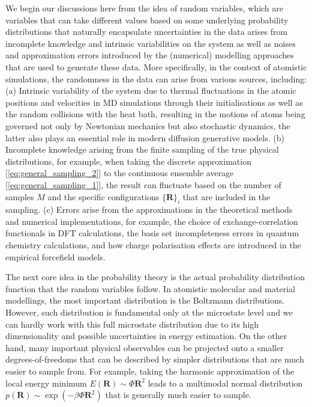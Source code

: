 We begin our discussions here from the idea of random variables, which are variables that can take different values based on some underlying probability distributions that naturally encapsulate uncertainties in the data arises from incomplete knowledge and intrinsic variabilities on the system as well as noises and approximation errors introduced by the (numerical) modelling approaches that are used to generate these data. More specifically, in the context of atomistic simulations, the randomness in the data can arise from various sources, including: (a) Intrinsic variability of the system due to thermal fluctuations in the atomic positions and velocities in MD simulations through their initialisations as well as the random collisions with the heat bath, resulting in the motions of atoms being governed not only by Newtonian mechanics but also stochastic dynamics, the latter also plays an essential role in modern diffusion generative models.\cite{song2020score} (b) Incomplete knowledge arising from the finite sampling of the true physical distributions, for example, when taking the discrete approximation [\cref{eq:general_sampling_2}] to the continuous ensemble average [\cref{eq:general_sampling_1}], the result can fluctuate based on the number of samples $M$ and the specific configurations $\{\bm{R}\}_i$ that are included in the sampling. (c) Errors arise from the approximations in the theoretical methods and numerical implementations, for example, the choice of exchange-correlation functionals in DFT calculations, the basis set incompleteness errors in quantum chemistry calculations, and how charge polarisation effects are introduced in the empirical forcefield models. 


The next core idea in the probability theory is the actual probability distribution function that the random variables follow. In atomistic molecular and material modellings, the most important distribution is the Boltzmann distributions. However, such distribution is fundamental only at the microstate level and we can hardly work with this full microstate distribution due to its high dimensionality and possible uncertainties in energy estimation. On the other hand, many important physical observables can be projected onto a smaller degrees-of-freedoms that can be described by simpler distributions that are much easier to sample from. For example, taking the harmonic approximation of the local energy minimum $E(\bm{R})\sim\Phi\bm{R}^2$ leads to a multimodal normal distribution $p(\bm{R})\sim \exp(-\beta\Phi\bm{R}^2)$ that is generally much easier to sample. 

